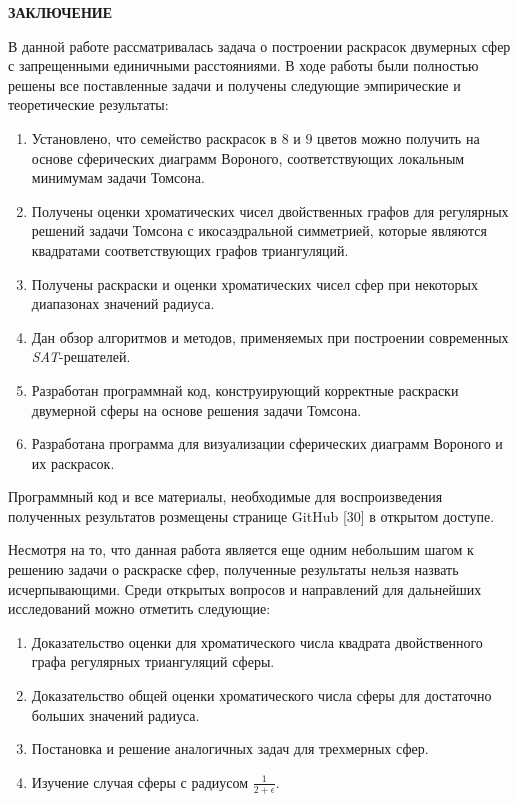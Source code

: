\newpage
\begin{center}
\noindent\textbf{ЗАКЛЮЧЕНИЕ}\label{chapters:conclusions}
\vspace{1.5mm}
\end{center}

В данной работе рассматривалась задача о построении раскрасок двумерных сфер с запрещенными единичными расстояниями. 
В ходе работы были полностью решены все поставленные задачи и получены следующие эмпирические и теоретические результаты:

\begin{enumerate}[leftmargin=1cm,topsep=0pt,itemsep=-1ex,partopsep=1ex,parsep=1ex,label=\arabic{*}.]

\item Установлено, что семейство раскрасок в $8$ и $9$ цветов можно получить на основе сферических диаграмм Вороного, соответствующих локальным минимумам задачи Томсона.  

\item Получены оценки хроматических чисел двойственных графов для регулярных решений задачи Томсона с икосаэдральной симметрией, которые являются квадратами соответствующих графов триангуляций.

\item Получены раскраски и оценки хроматических чисел сфер при некоторых диапазонах значений радиуса.

\item Дан обзор алгоритмов и методов, применяемых при построении современных \textit{SAT}-решателей.

\item Разработан программнай код, конструирующий корректные раскраски двумерной сферы на основе решения задачи Томсона.

\item Разработана программа для визуализации сферических диаграмм Вороного и их раскрасок.

\end{enumerate}

Программный код и все материалы, необходимые для воспроизведения полученных результатов розмещены странице GitHub [30] в открытом доступе.

Несмотря на то, что данная работа является еще одним небольшим шагом к решению задачи о раскраске сфер, полученные результаты нельзя назвать исчерпывающими. Среди открытых вопросов и направлений для дальнейших исследований можно отметить следующие:

\begin{enumerate}[leftmargin=1cm,topsep=0pt,itemsep=-1ex,partopsep=1ex,parsep=1ex,label=\arabic{*}.]

\item Доказательство оценки для хроматического числа квадрата двойственного графа регулярных триангуляций сферы.
\item Доказательство общей оценки хроматического числа сферы для достаточно больших значений радиуса.
\item Постановка и решение аналогичных задач для трехмерных сфер.
\item Изучение случая сферы с радиусом $\frac{1}{2+\epsilon}$.

\end{enumerate}
